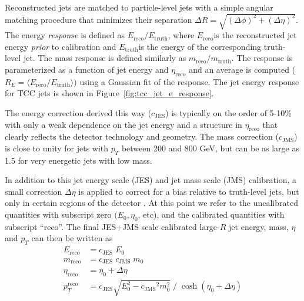 {
\newcommand{\EReco}{\ensuremath{E_{\mathrm{reco}}}}
\newcommand{\ETruth}{\ensuremath{E_{\mathrm{truth}}}}
\newcommand{\MReco}{\ensuremath{m_{\mathrm{reco}}}}
\newcommand{\MTruth}{\ensuremath{m_{\mathrm{truth}}}}
\newcommand{\CJES}{\ensuremath{c_{\mathrm{JES}}}}
\newcommand{\CJMS}{\ensuremath{c_{\mathrm{JMS}}}}
\newcommand{\EtaReco}{\ensuremath{\eta_{\mathrm{reco}}}}
Reconstructed jets are matched to particle-level jets with a simple angular matching procedure that minimizes their separation $\Delta R = \sqrt{(\Delta \phi)^2 + (\Delta \eta)^2}$.
The energy \textit{response} is defined as $\EReco / \ETruth$, where \EReco is the reconstructed jet energy \textit{prior} to calibration and \ETruth is the energy of the corresponding truth-level jet.
The mass response is defined similarly as $\MReco / \MTruth$.
The response is parameterized as a function of jet energy and $\eta_{\mathrm{reco}}$ and an average is computed ($R_E = \langle \EReco / \ETruth \rangle)$ using a Gaussian fit of the response. The jet energy response for TCC jets is shown in Figure~\ref{fig:tcc_jet_e_response}.

The energy correction derived this way (\CJES) is typically on the order of 5-10\% with only a weak dependence on the jet energy and a structure in $\eta_{\mathrm{reco}}$ that clearly reflects the detector technology and geometry.
The mass correction (\CJMS) is close to unity for jets with $p_T$ between 200 and 800 GeV, but can be as large as 1.5 for very energetic jets with low mass.

In addition to this jet energy scale (JES) and jet mass scale (JMS) calibration, a small correction $\Delta \eta$ is applied to correct for a bias relative to truth-level jets, but only in certain regions of the detector \cite{TheATLAScollaboration:2015soq}. 
At this point we refer to the uncalibrated quantities with subscript zero $(E_0, \eta_0$, etc), and the calibrated quantities with subscript ``reco''.
The final JES+JMS scale calibrated large-$R$ jet energy, mass, $\eta$ and $p_T$ can then be written as
\begin{align}
    \EReco &= \CJES\; E_0\\
    \MReco &= \CJES\; \CJMS\; m_0\\
    \EtaReco &= \eta_0 + \Delta \eta\\
    p_T^{\mathrm{reco}} &= \CJES \sqrt{E_0^2 - \CJMS^2 m_0^2}\; /\; \cosh{(\eta_0 + \Delta \eta)}
\end{align}
}

